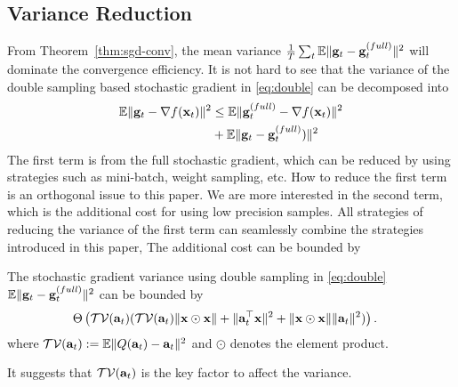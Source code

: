 \subsection{Variance Reduction}
From Theorem~\ref{thm:sgd-conv}, the mean variance ${1\over T}\sum_{t}\mathbb{E}\|{\bf g}_t - {\bf g}_t^{(full)}\|^2$ will dominate the convergence efficiency. It is not hard to see that the variance of the double sampling based stochastic gradient in \eqref{eq:double} can be decomposed into
\begin{align*}
\mathbb{E}\|{\bf g}_t - \nabla f({\bf x}_t)\|^2 & \leq \mathbb{E} \|{\bf g}_t^{(full)}- \nabla f({\bf x}_t)\|^2 
\\
&+ \mathbb{E} \|{\bf g}_t - {\bf g}_t^{(full)})\|^2
\end{align*}
The first term is from the full stochastic gradient, which can be reduced by using strategies such as mini-batch, weight sampling, etc. How to reduce the first term is an orthogonal issue to this paper. We are more interested in the second term, which is the additional cost for using low precision samples. All strategies of reducing the variance of the first term can seamlessly combine the strategies introduced in this paper, The additional cost can be bounded by
\begin{lemma} 
The stochastic gradient variance using double sampling in \eqref{eq:double} $\mathbb{E}\|{\bf g}_t - {\bf g}_t^{(full)}\|^2$ can be bounded by
\begin{align*}
&\Theta\left(\mathcal{TV}({\bf a}_t) (\mathcal{TV}({\bf a}_t)\|{\bf x}\odot {\bf x}\| + \|{\bf a}_t^\top {\bf x}\|^2 + \|{\bf x}\odot {\bf x}\|\|{\bf a}_t\|^2)\right).
\end{align*}
where $\mathcal{TV}({\bf a}_t) := \mathbb{E}\|Q({\bf a}_t) - {\bf a}_t\|^2$ and $\odot$ denotes the element product.
\end{lemma}
It suggests that $\mathcal{TV}({\bf a}_t)$ is the key factor to affect the variance. 

